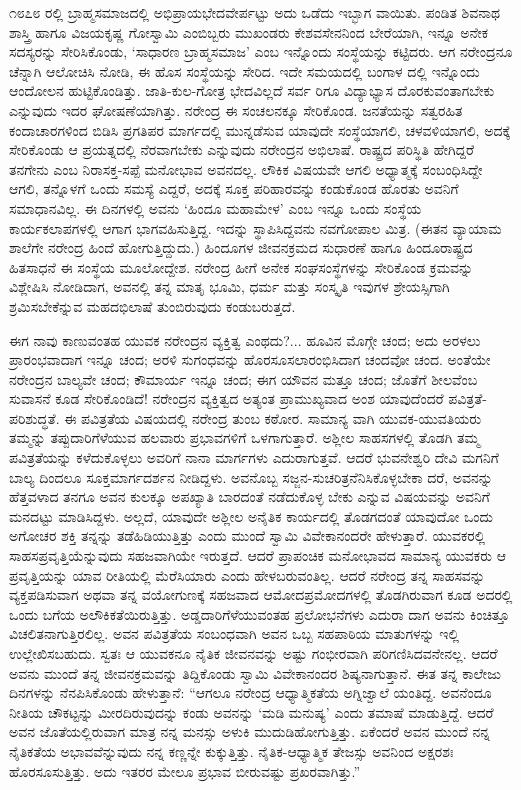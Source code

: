 ೧೮೭೮ ರಲ್ಲಿ ಬ್ರಾಹ್ಮಸಮಾಜದಲ್ಲಿ ಅಭಿಪ್ರಾಯಭೇದವೇರ್ಪಟ್ಟು ಅದು ಒಡೆದು ಇಬ್ಭಾಗ ವಾಯಿತು. ಪಂಡಿತ ಶಿವನಾಥ ಶಾಸ್ತ್ರಿ ಹಾಗೂ ವಿಜಯಕೃಷ್ಣ ಗೋಸ್ವಾಮಿ ಎಂಬಿಬ್ಬರು ಮುಖಂಡರು ಕೇಶವಸೇನನಿಂದ ಬೇರೆಯಾಗಿ, ಇನ್ನೂ ಅನೇಕ ಸದಸ್ಯರನ್ನು ಸೇರಿಸಿಕೊಂಡು, ‘ಸಾಧಾರಣ ಬ್ರಾಹ್ಮಸಮಾಜ’ ಎಂಬ ಇನ್ನೊಂದು ಸಂಸ್ಥೆಯನ್ನು ಕಟ್ಟಿದರು. ಆಗ ನರೇಂದ್ರನೂ ಚೆನ್ನಾಗಿ ಆಲೋಚಿಸಿ ನೋಡಿ, ಈ ಹೊಸ ಸಂಸ್ಥೆಯನ್ನು ಸೇರಿದ. ಇದೇ ಸಮಯದಲ್ಲಿ ಬಂಗಾಳ ದಲ್ಲಿ ಇನ್ನೊಂದು ಆಂದೋಲನ ಹುಟ್ಟಿಕೊಂಡಿತ್ತು. ಜಾತಿ-ಕುಲ-ಗೋತ್ರ ಭೇದವಿಲ್ಲದೆ ಸರ್ವ ರಿಗೂ ವಿದ್ಯಾಭ್ಯಾಸ ದೊರಕುವಂತಾಗಬೇಕು ಎನ್ನುವುದು ಇದರ ಘೋಷಣೆಯಾಗಿತ್ತು. ನರೇಂದ್ರ ಈ ಸಂಚಲನಕ್ಕೂ ಸೇರಿಕೊಂಡ. ಜನತೆಯನ್ನು ಸತ್ವರಹಿತ ಕಂದಾಚಾರಗಳಿಂದ ಬಿಡಿಸಿ ಪ್ರಗತಿಪರ ಮಾರ್ಗದಲ್ಲಿ ಮುನ್ನಡೆಸುವ ಯಾವುದೇ ಸಂಸ್ಥೆಯಾಗಲಿ, ಚಳವಳಿಯಾಗಲಿ, ಅದಕ್ಕೆ ಸೇರಿಕೊಂಡು ಆ ಪ್ರಯತ್ನದಲ್ಲಿ ನೆರವಾಗಬೇಕು ಎನ್ನುವುದು ನರೇಂದ್ರನ ಅಭಿಲಾಷೆ. ರಾಷ್ಟ್ರದ ಪರಿಸ್ಥಿತಿ ಹೇಗಿದ್ದರೆ ತನಗೇನು ಎಂಬ ನಿರಾಸಕ್ತ-ಸಪ್ಪೆ ಮನೋಭಾವ ಅವನದಲ್ಲ. ಲೌಕಿಕ ವಿಷಯವೇ ಆಗಲಿ ಅಧ್ಯಾತ್ಮಕ್ಕೆ ಸಂಬಂಧಿಸಿದ್ದೇ ಆಗಲಿ, ತನ್ನೊಳಗೆ ಒಂದು ಸಮಸ್ಯೆ ಎದ್ದರೆ, ಅದಕ್ಕೆ ಸೂಕ್ತ ಪರಿಹಾರವನ್ನು ಕಂಡುಕೊಂಡ ಹೊರತು ಅವನಿಗೆ ಸಮಾಧಾನವಿಲ್ಲ. ಈ ದಿನಗಳಲ್ಲಿ ಅವನು ‘ಹಿಂದೂ ಮಹಾಮೇಳ’ ಎಂಬ ಇನ್ನೂ ಒಂದು ಸಂಸ್ಥೆಯ ಕಾರ್ಯಕಲಾಪಗಳಲ್ಲಿ ಆಗಾಗ ಭಾಗವಹಿಸುತ್ತಿದ್ದ. ಇದನ್ನು ಸ್ಥಾಪಿಸಿದ್ದವನು ನವಗೋಪಾಲ ಮಿತ್ರ. (ಈತನ ವ್ಯಾಯಾಮ ಶಾಲೆಗೇ ನರೇಂದ್ರ ಹಿಂದೆ ಹೋಗುತ್ತಿದ್ದುದು.) ಹಿಂದೂಗಳ ಜೀವನಕ್ರಮದ ಸುಧಾರಣೆ ಹಾಗೂ ಹಿಂದೂರಾಷ್ಟ್ರದ ಹಿತಸಾಧನೆ ಈ ಸಂಸ್ಥೆಯ ಮೂಲೋದ್ದೇಶ. ನರೇಂದ್ರ ಹೀಗೆ ಅನೇಕ ಸಂಘಸಂಸ್ಥೆಗಳನ್ನು ಸೇರಿಕೊಂಡ ಕ್ರಮವನ್ನು ವಿಶ್ಲೇಷಿಸಿ ನೋಡಿದಾಗ, ಅವನಲ್ಲಿ ತನ್ನ ಮಾತೃ ಭೂಮಿ, ಧರ್ಮ ಮತ್ತು ಸಂಸ್ಕೃತಿ ಇವುಗಳ ಶ್ರೇಯಸ್ಸಿಗಾಗಿ ಶ್ರಮಿಸಬೇಕೆನ್ನುವ ಮಹದಭಿಲಾಷೆ ತುಂಬಿರುವುದು ಕಂಡುಬರುತ್ತದೆ.

ಈಗ ನಾವು ಕಾಣುವಂತಹ ಯುವಕ ನರೇಂದ್ರನ ವ್ಯಕ್ತಿತ್ವ ಎಂಥದು?... ಹೂವಿನ ಮೊಗ್ಗೇ ಚಂದ; ಅದು ಅರಳಲು ಪ್ರಾರಂಭವಾದಾಗ ಇನ್ನೂ ಚಂದ; ಅರಳಿ ಸುಗಂಧವನ್ನು ಹೊರಸೂಸಲಾರಂಭಿಸಿದಾಗ ಚಂದವೋ ಚಂದ. ಅಂತೆಯೇ ನರೇಂದ್ರನ ಬಾಲ್ಯವೇ ಚಂದ; ಕೌಮಾರ್ಯ ಇನ್ನೂ ಚಂದ; ಈಗ ಯೌವನ ಮತ್ತೂ ಚಂದ; ಜೊತೆಗೆ ಶೀಲವೆಂಬ ಸುವಾಸನೆ ಕೂಡ ಸೇರಿಕೊಂಡಿದೆ! ನರೇಂದ್ರನ ವ್ಯಕ್ತಿತ್ವದ ಅತ್ಯಂತ ಪ್ರಾಮುಖ್ಯವಾದ ಅಂಶ ಯಾವುದೆಂದರೆ ಪವಿತ್ರತೆ-ಪರಿಶುದ್ಧತೆ. ಈ ಪವಿತ್ರತೆಯ ವಿಷಯದಲ್ಲಿ ನರೇಂದ್ರ ತುಂಬ ಕಠೋರ. ಸಾಮಾನ್ಯ ವಾಗಿ ಯುವಕ-ಯುವತಿಯರು ತಮ್ಮನ್ನು ತಪ್ಪುದಾರಿಗೆಳೆಯುವ ಹಲವಾರು ಪ್ರಭಾವಗಳಿಗೆ ಒಳಗಾಗುತ್ತಾರೆ. ಅಶ್ಲೀಲ ಸಾಹಸಗಳಲ್ಲಿ ತೊಡಗಿ ತಮ್ಮ ಪವಿತ್ರತೆಯನ್ನು ಕಳೆದುಕೊಳ್ಳಲು ಅವರಿಗೆ ನಾನಾ ಮಾರ್ಗಗಳು ಎದುರಾಗುತ್ತವೆ. ಆದರೆ ಭುವನೇಶ್ವರಿ ದೇವಿ ಮಗನಿಗೆ ಬಾಲ್ಯ ದಿಂದಲೂ ಸೂಕ್ತಮಾರ್ಗದರ್ಶನ ನೀಡಿದ್ದಳು. ಅವನೊಬ್ಬ ಸಜ್ಜನ-ಸುಚರಿತ್ರನೆನಿಸಿಕೊಳ್ಳಬೇಕಾ ದರೆ, ಅವನನ್ನು ಹೆತ್ತವಳಾದ ತನಗೂ ಅವನ ಕುಲಕ್ಕೂ ಅಪಖ್ಯಾತಿ ಬಾರದಂತೆ ನಡೆದುಕೊಳ್ಳ ಬೇಕು ಎನ್ನುವ ವಿಷಯವನ್ನು ಅವನಿಗೆ ಮನದಟ್ಟು ಮಾಡಿಸಿದ್ದಳು. ಅಲ್ಲದೆ, ಯಾವುದೇ ಅಶ್ಲೀಲ ಅನೈತಿಕ ಕಾರ್ಯದಲ್ಲಿ ತೊಡಗದಂತೆ ಯಾವುದೋ ಒಂದು ಅಗೋಚರ ಶಕ್ತಿ ತನ್ನನ್ನು ತಡೆಹಿಡಿಯುತ್ತಿತ್ತು ಎಂದು ಮುಂದೆ ಸ್ವಾಮಿ ವಿವೇಕಾನಂದರೇ ಹೇಳುತ್ತಾರೆ. ಯುವಕರಲ್ಲಿ ಸಾಹಸಪ್ರವೃತ್ತಿಯೆನ್ನುವುದು ಸಹಜವಾಗಿಯೇ ಇರುತ್ತದೆ. ಆದರೆ ಪ್ರಾಪಂಚಿಕ ಮನೋಭಾವದ ಸಾಮಾನ್ಯ ಯುವಕರು ಆ ಪ್ರವೃತ್ತಿಯನ್ನು ಯಾವ ರೀತಿಯಲ್ಲಿ ಮೆರೆಸಿಯಾರು ಎಂದು ಹೇಳಬರುವಂತಿಲ್ಲ. ಆದರೆ ನರೇಂದ್ರ ತನ್ನ ಸಾಹಸವನ್ನು ವ್ಯಕ್ತಪಡಿಸುವಾಗ ಅಥವಾ ತನ್ನ ವಯೋಗುಣಕ್ಕೆ ಸಹಜವಾದ ಆಮೋದಪ್ರಮೋದಗಳಲ್ಲಿ ತೊಡಗಿರುವಾಗ ಕೂಡ ಅದರಲ್ಲಿ ಒಂದು ಬಗೆಯ ಅಲೌಕಿಕತೆಯಿರುತ್ತಿತ್ತು. ಅಡ್ಡದಾರಿಗೆಳೆಯುವಂತಹ ಪ್ರಲೋಭನೆಗಳು ಎದುರಾ ದಾಗ ಅವನು ಕಿಂಚಿತ್ತೂ ವಿಚಲಿತನಾಗುತ್ತಿರಲಿಲ್ಲ. ಅವನ ಪವಿತ್ರತೆಯ ಸಂಬಂಧವಾಗಿ ಅವನ ಒಬ್ಬ ಸಹಪಾಠಿಯ ಮಾತುಗಳನ್ನು ಇಲ್ಲಿ ಉಲ್ಲೇಖಿಸಬಹುದು. ಸ್ವತಃ ಆ ಯುವಕನೂ ನೈತಿಕ ಜೀವನವನ್ನು ಅಷ್ಟು ಗಂಭೀರವಾಗಿ ಪರಿಗಣಿಸಿದವನೇನಲ್ಲ. ಆದರೆ ಅವನು ಮುಂದೆ ತನ್ನ ಜೀವನಕ್ರಮವನ್ನು ತಿದ್ದಿಕೊಂಡು ಸ್ವಾಮಿ ವಿವೇಕಾನಂದರ ಶಿಷ್ಯನಾಗುತ್ತಾನೆ. ಈತ ತನ್ನ ಕಾಲೇಜು ದಿನಗಳನ್ನು ನೆನಪಿಸಿಕೊಂಡು ಹೇಳುತ್ತಾನೆ: “ಆಗಲೂ ನರೇಂದ್ರ ಆಧ್ಯಾತ್ಮಿಕತೆಯ ಅಗ್ನಿಜ್ವಾಲೆ ಯಂತಿದ್ದ. ಅವನೆಂದೂ ನೀತಿಯ ಚೌಕಟ್ಟನ್ನು ಮೀರದಿರುವುದನ್ನು ಕಂಡು ಅವನನ್ನು ‘ಮಡಿ ಮನುಷ್ಯ’ ಎಂದು ತಮಾಷೆ ಮಾಡುತ್ತಿದ್ದೆ. ಆದರೆ ಅವನ ಜೊತೆಯಲ್ಲಿರುವಾಗ ಮಾತ್ರ ನನ್ನ ಮನಸ್ಸು ಅಳುಕಿ ಮುದುಡಿಹೋಗುತ್ತಿತ್ತು. ಏಕೆಂದರೆ ಅವನ ಮುಂದೆ ನನ್ನ ನೈತಿಕತೆಯ ಅಭಾವವೆನ್ನುವುದು ನನ್ನ ಕಣ್ಣನ್ನೇ ಕುಕ್ಕುತ್ತಿತ್ತು. ನೈತಿಕ-ಆಧ್ಯಾತ್ಮಿಕ ತೇಜಸ್ಸು ಅವನಿಂದ ಅಕ್ಷರಶಃ ಹೊರಸೂಸುತ್ತಿತ್ತು. ಅದು ಇತರರ ಮೇಲೂ ಪ್ರಭಾವ ಬೀರುವಷ್ಟು ಪ್ರಖರವಾಗಿತ್ತು.”

